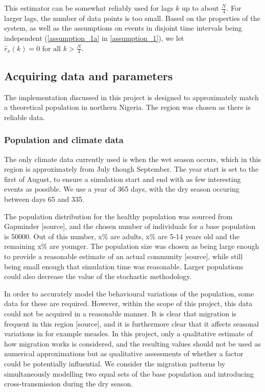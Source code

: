 \documentclass[10pt,a4paper]{article}
\begin{document}
This estimator can be somewhat reliably used for lags $k$ up to about $\frac{N}{4}$. For larger lags, the number of data points is too small. Based on the properties of the system, as well as the assumptions on events in disjoint time intervals being independent (\cref{assumption_1a} in \cref{assumption_1}), we let $\hat{r}_x \left( k \right) = 0 \textrm{ for all } k > \frac{N}{4}$.

\subsection{Acquiring data and parameters}

The implementation discussed in this project is designed to approximately match a theoretical population in northern Nigeria. The region was chosen as there is reliable data.

\subsubsection{Population and climate data}

The only climate data currently used is when the wet season occurs, which in this region is approximately from July though September. The year start is set to the first of August, to ensure a simulation start and end with as few interesting events as possible. We use a year of 365 days, with the dry season occuring between days 65 and 335.

The population distribution for the healthy population was sourced from Gapminder [source], and the chosen number of individuals for a base population is 50000. Out of this number, x\% are adults, x\% are 5-14 years old and the remaining x\% are younger. The population size was chosen as being large enough to provide a reasonable estimate of an actual community [source], while still being small enough that simulation time was reasonable. Larger populations could also decrease the value of the stochastic methodology.



In order to accurately model the behavioural variations of the population, some data for these are required. However, within the scope of this project, this data could not be acquired in a reasonable manner. It is clear that migration is frequent in this region [source], and it is furthermore clear that it affects seasonal variations in for example measles. In this project, only a qualitative estimate of how migration works is considered, and the resulting values should not be used as numerical approximations but as qualitative assessments of whether a factor could be potentially influential. We consider the migration patterns by simultaneously modelling two equal sets of the base population and introducing cross-transmission during the dry season.
\end{document}
